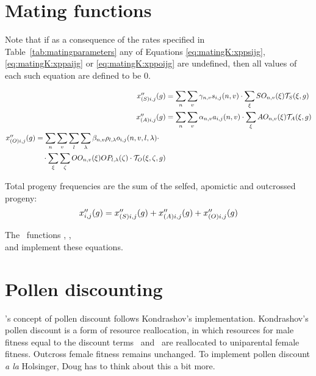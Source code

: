 \section{Mating functions}
\label{sec:matingK:matingfunctions}

Note that if as a consequence of the rates specified in Table~\ref{tab:matingparameters} any of Equations \eqref{eq:matingK:xppsijg}, \eqref{eq:matingK:xppaijg} or \eqref{eq:matingK:xppoijg} are undefined, then all values of each such equation are defined to be $0$.

\begin{align}
\label{eq:matingK:xppsijg}
\mbox{$x''_{(S)i,j}(g)$} &= \sum_{n}{
							\sum_{v}{
								\mbox{$\gamma_{n,v}$} \mbox{$s_{i,j}(n,v)$} \cdot
									\sum_{\xi}{
										\mbox{$SO_{n,v}(\xi)$} \mbox{${\cal T}_{S}(\xi,g)$}
									}
						}}
    \\
\label{eq:matingK:xppaijg}
\mbox{$x''_{(A)i,j}(g)$} &= \sum_{n}{
							\sum_{v}{
								\mbox{$\alpha_{n,v}$} \mbox{$a_{i,j}(n,v)$} \cdot
									\sum_{\xi}{
										\mbox{$AO_{n,v}(\xi)$} \mbox{${\cal T}_{A}(\xi,g)$}
									}
						}}
    \\
\begin{split}
\label{eq:matingK:xppoijg}
\mbox{$x''_{(O)i,j}(g)$} &= \sum_{n}{
							\sum_{v}{
								\sum_{l}{
									\sum_{\lambda}{
										\mbox{$\beta_{n,v}$} \mbox{$\rho_{l,\lambda}$} \mbox{$o_{i,j}(n,v,l,\lambda)$} 
						}}}} \cdot \\
				&\quad \cdot	\sum_{\xi}{
												\sum_{\zeta}{
													\mbox{$OO_{n,v}(\xi)$} \mbox{$OP_{l,\lambda}(\zeta)$} \cdot \mbox{${\cal T}_{O}(\xi,\zeta,g)$}
											}}
\end{split}
\end{align}

Total progeny frequencies are the sum of the selfed, apomictic and outcrossed progeny:
\begin{equation}
\mbox{$x''_{i,j}(g)$} = \mbox{$x''_{(S)i,j}(g)$} + \mbox{$x''_{(A)i,j}(g)$} + \mbox{$x''_{(O)i,j}(g)$}
\end{equation}

The \K\ functions , 
, \\
 and  implement these equations.

\section{Pollen discounting}

\K's concept of pollen discount follows Kondrashov's implementation.  Kondrashov's pollen discount is a form of resource reallocation, in which resources for male fitness equal to the discount terms \DSg\Sg\ and \DAg\Ag\ are reallocated to uniparental female fitness.  Outcross female fitness remains unchanged.  To implement pollen discount {\it a la} Holsinger, Doug has to think about this a bit more.

